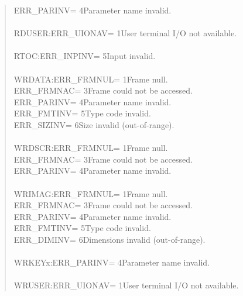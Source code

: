 \begin{quote}
\begin{tabbing}
\>ERR\_PARINV\>= 4\>Parameter name invalid.\\
\\
RDUSER:\>ERR\_UIONAV\>= 1\>User terminal I/O not available.\\
\\
RTOC:\>ERR\_INPINV\>= 5\>Input invalid.\\
\\
WRDATA:\>ERR\_FRMNUL\>= 1\>Frame null.\\
\>ERR\_FRMNAC\>= 3\>Frame could not be accessed.\\
\>ERR\_PARINV\>= 4\>Parameter name invalid.\\
\>ERR\_FMTINV\>= 5\>Type code invalid.\\
\>ERR\_SIZINV\>= 6\>Size invalid (out-of-range).\\
\\
WRDSCR:\>ERR\_FRMNUL\>= 1\>Frame null.\\
\>ERR\_FRMNAC\>= 3\>Frame could not be accessed.\\
\>ERR\_PARINV\>= 4\>Parameter name invalid.\\
\\
WRIMAG:\>ERR\_FRMNUL\>= 1\>Frame null.\\
\>ERR\_FRMNAC\>= 3\>Frame could not be accessed.\\
\>ERR\_PARINV\>= 4\>Parameter name invalid.\\
\>ERR\_FMTINV\>= 5\>Type code invalid.\\
\>ERR\_DIMINV\>= 6\>Dimensions invalid (out-of-range).\\
\\
WRKEYx:\>ERR\_PARINV\>= 4\>Parameter name invalid.\\
\\
WRUSER:\>ERR\_UIONAV\>= 1\>User terminal I/O not available.
\end{tabbing}
\end{quote}
